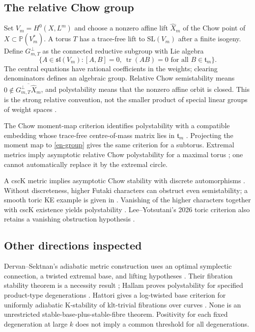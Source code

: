 \documentclass[12pt]{amsart}
\theoremstyle{definition}
\theoremstyle{remark}
\numberwithin{equation}{section}
\DeclareMathOperator{\tr}{tr}
\newcommand{\mP}{\mathbb{P}}
\begin{document}
\subsection{The relative Chow group}
Set $V_m=H^0(X,L^m)$ and choose a nonzero affine lift $\widehat X_m$ of the Chow point of $X\subset\mP(V_m^*)$. A torus $T$ has a trace-free lift to $\mathrm{SL}(V_m)$ after a finite isogeny. Define $G_{m,T}^{\perp}$ as the connected reductive subgroup with Lie algebra
\begin{equation}\label{en-group}
\{A\in\mathfrak{sl}(V_m):[A,B]=0,\ \tr(AB)=0\text{ for all }B\in\mathfrak t_m\}.
\end{equation}
The central equations have rational coefficients in the weights; clearing denominators defines an algebraic group. Relative Chow semistability means
$0\notin\overline{G_{m,T}^{\perp}\widehat X_m}$, and polystability means that the nonzero affine orbit is closed. This is the strong relative convention, not the smaller product of special linear groups of weight spaces \cite[Definitions 3.4--3.5]{en-Has17}.

The Chow moment-map criterion identifies polystability with a compatible embedding whose trace-free centre-of-mass matrix lies in $\mathfrak t_m$ \cite[Theorem 3.4]{en-Tip}. Projecting the moment map to \eqref{en-group} gives the same criterion for a subtorus. Extremal metrics imply asymptotic relative Chow polystability for a maximal torus \cite{en-Mab16,en-Sey,en-ST}; one cannot automatically replace it by the extremal circle.

A cscK metric implies asymptotic Chow stability with discrete automorphisms \cite{en-Don01}. Without discreteness, higher Futaki characters can obstruct even semistability; a smooth toric KE example is given in \cite{en-OSY}. Vanishing of the higher characters together with cscK existence yields polystability \cite{en-Mab05,en-Fut04}. Lee--Yotsutani's 2026 toric criterion also retains a vanishing obstruction hypothesis \cite{en-LY26}.

\subsection{Other directions inspected}
Dervan--Sektnan's adiabatic metric construction uses an optimal symplectic connection, a twisted extremal base, and lifting hypotheses \cite{en-DS19}. Their fibration stability theorem is a necessity result \cite{en-DS20}; Hallam proves polystability for specified product-type degenerations \cite[Theorem 1.4]{en-Hal20}. Hattori gives a log-twisted base criterion for uniformly adiabatic K-stability of klt-trivial fibrations over curves \cite[Theorem 1.1]{en-Hat}. None is an unrestricted stable-base-plus-stable-fibre theorem. Positivity for each fixed degeneration at large $k$ does not imply a common threshold for all degenerations.
\end{document}
